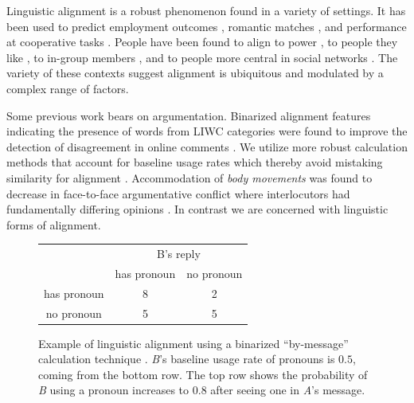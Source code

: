 \documentclass[11pt,a4paper]{article}
\begin{document}
Linguistic alignment is a robust phenomenon found in a variety of settings. It has been used to predict employment outcomes \cite{SrivastavaGMP18}, romantic matches \cite{IrelandSESFP}, and performance at cooperative tasks \cite{FusaroliBORRFT12, KacewiczPDJG14}. People have been found to align to power \cite{WillemynsGCP97, Gnisci05, DanescuLPK11}, to people they like \cite{BilousK88, Natale75}, to in-group members \cite{ShinD18}, and to people more central in social networks \cite{NobleF15}. The variety of these contexts suggest alignment is ubiquitous and modulated by a complex range of factors.

Some previous work bears on argumentation. Binarized alignment features indicating the presence of words from LIWC categories were found to improve the detection of disagreement in online comments \cite{RosenthalM15}. We utilize more robust calculation methods that account for baseline usage rates which thereby avoid mistaking similarity for alignment \cite{DoyleYF16}. Accommodation of \textit{body movements} was found to decrease in face-to-face argumentative conflict where interlocutors had fundamentally differing opinions \cite{PaxtonD13, DuranF17}. In contrast we are concerned with linguistic forms of alignment.

\begin{figure}[t]
\begin{center}
\small
\begin{tabular}{|c|cc|}
\hline
\multirow{2}{*}{} & \multicolumn{2}{c|}{B's reply} \\
A's message & has pronoun & no pronoun \\
\hline
has pronoun & 8 & 2 \\
no pronoun & 5 & 5\\
\hline
\end{tabular}
\end{center}
\caption{Example of linguistic alignment using a binarized ``by-message'' calculation technique \cite{DoyleF16}. \textit{B}'s baseline usage rate of pronouns is $0.5$, coming from the bottom row. The top row shows the probability of \textit{B} using a pronoun increases to $0.8$ after seeing one in \textit{A}'s message.}
\end{figure}
\end{document}

